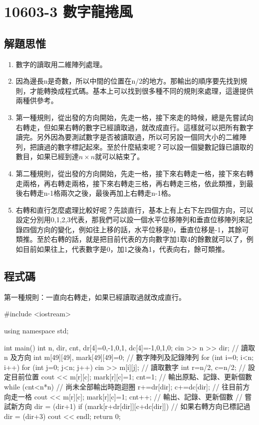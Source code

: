 \section{10603-3 數字龍捲風}

\subsection{解題思惟}
\begin{enumerate}
	\item 數字的讀取用二維陣列處理。
	\item 因為邊長n是奇數，所以中間的位置在n/2的地方。那輸出的順序要先找到規則，才能轉換成程式碼。基本上可以找到很多種不同的規則來處理，這邊提供兩種供參考。
	\item 第一種規則，從出發的方向開始，先走一格，接下來走的時候，總是先嘗試向右轉走，但如果右轉的數字已經讀取過，就改成直行。這樣就可以把所有數字讀完。另外因為要測試數字是否被讀取過，所以可另設一個同大小的二維陣列，把讀過的數字標記起來。至於什麼結束呢？可以設一個變數記錄已讀取的數目，如果已經到達$n\times n$就可以結束了。
	\item 第二種規則，從出發的方向開始，先走一格，接下來右轉走一格，接下來右轉走兩格，再右轉走兩格，接下來右轉走三格，再右轉走三格，依此類推，到最後右轉走n-1格兩次之後，最後再加上右轉走n-1格。
	\item 右轉和直行怎麼處理比較好呢？先談直行，基本上有上右下左四個方向，可以設定分別用0,1,2,3代表，那我們可以設一個水平位移陣列和垂直位移陣列來記錄四個方向的變化，例如往上移的話，水平位移是0，垂直位移是-1，其餘可類推。至於右轉的話，就是把目前代表的方向數字加1取4的餘數就可以了，例如目前如果往上，代表數字是0，加1之後為1，代表向右，餘可類推。
\end{enumerate}

\subsection{程式碼}
第一種規則：一直向右轉走，如果已經讀取過就改成直行。
\begin{cppcode}
#include <iostream>

using namespace std;

int main()
{
	int n, dir, cnt, dr[4]={0,-1,0,1}, dc[4]={-1,0,1,0};
	cin >> n >> dir; // 讀取 n 及方向
	int m[49][49], mark[49][49]={{0}}; // 數字陣列及記錄陣列
	for (int i=0; i<n; i++) {
		for (int j=0; j<n; j++) cin >> m[i][j]; // 讀取數字
	}
	int r=n/2, c=n/2; // 設定目前位置
	cout << m[r][c]; mark[r][c]=1; cnt=1; // 輸出原點、記錄、更新個數
	while (cnt<n*n) { // 尚未全部輸出時跑迴圈
		r+=dr[dir]; c+=dc[dir]; // 往目前方向走一格
		cout << m[r][c]; mark[r][c]=1; cnt++; // 輸出、記錄、更新個數
		// 嘗試新方向
		dir = (dir+1) %
		if (mark[r+dr[dir]][c+dc[dir]]) { // 如果右轉方向已標記過
			dir = (dir+3) %
		}
	}
	cout << endl;
	return 0;
}
\end{cppcode}

